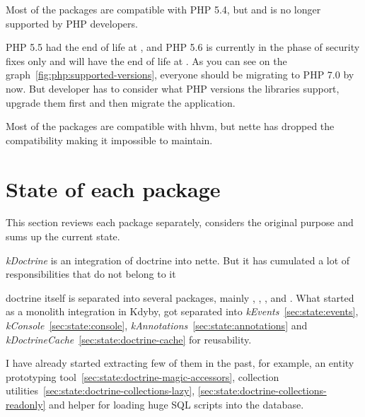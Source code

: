 Most of the packages are compatible with PHP 5.4, but  and is no longer supported by PHP developers.

PHP 5.5 had the end of life at , and PHP 5.6 is currently in the phase of security fixes only and will have the end of life at . As you can see on the graph~\ref{fig:php:supported-versions}, everyone should be migrating to PHP 7.0 by now. But developer has to consider what PHP versions the libraries support, upgrade them first and then migrate the application.

Most of the packages are compatible with \gls{hhvm}, but \gls{nette} has dropped the compatibility making it impossible to maintain.

\section{State of each package}

This section reviews each package separately, considers the original purpose and sums up the current state.

 \label{sec:state:doctrine}

\textit{\gls{kDoctrine}} is an integration of \gls{doctrine} into \gls{nette}. But it has cumulated a lot of responsibilities that do not belong to it

\gls{doctrine} itself is separated into several packages, mainly , , ,  and . What started as a monolith integration in Kdyby, got separated into \textit{\gls{kEvents}}~\ref{sec:state:events}, \textit{\gls{kConsole}}~\ref{sec:state:console}, \textit{\gls{kAnnotations}}~\ref{sec:state:annotations} and \textit{\gls{kDoctrineCache}}~\ref{sec:state:doctrine-cache} for reusability.

I have already started extracting few of them in the past, for example, an entity prototyping tool~\ref{sec:state:doctrine-magic-accessors}, collection utilities~\ref{sec:state:doctrine-collections-lazy}, \ref{sec:state:doctrine-collections-readonly} and helper for loading huge SQL scripts into the database.

